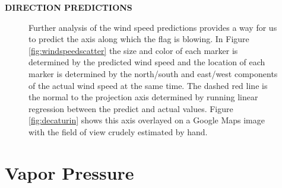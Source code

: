 \textbf{DIRECTION PREDICTIONS}
\begin{figure}
	\centering
	\caption{Further analysis of the wind speed predictions provides a way for us to predict the axis along which the flag is blowing. In Figure \ref{fig:windspeedscatter} the size and color of each marker is determined by the predicted wind speed and the location of each marker is determined by the north/south and east/west components of the actual wind speed at the same time. The dashed red line is the normal to the projection axis determined by running linear regression between the predict and actual values. Figure \ref{fig:decaturin} shows this axis overlayed on a Google Maps image with the field of view crudely estimated by hand.}
\end{figure}

\section{Vapor Pressure}

